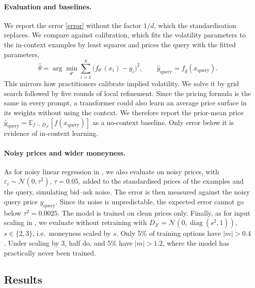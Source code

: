   \paragraph{Evaluation and baselines.}
  We report the error \eqref{error} without the factor $1/d$, which the standardisation
  replaces. We compare against calibration, which fits the volatility parameters to the
  in-context examples by least squares and prices the query with the fitted parameters,
  \begin{equation}
    \hat\theta = \arg\min_{\theta'} \sum_{i=1}^{k} \big(f_{\theta'}(x_i) - y_i\big)^2,
    \qquad \hat y_{\text{query}} = f_{\hat\theta}(x_{\text{query}}).
  \end{equation}
  This mirrors how practitioners calibrate implied volatility. We solve it by grid search
  followed by five rounds of local refinement. Since the pricing formula is the same in
  every prompt, a transformer could also learn an average price surface in its weights
  without using the context. We therefore report the prior-mean price
  $\hat y_{\text{query}} = \mathbb{E}_{f \sim D_\mathcal{F}}[f(x_{\text{query}})]$ as a
  no-context baseline. Only error below it is evidence of in-context learning.
    
    \vspace{-1em}
  \paragraph{Noisy prices and wider moneyness.}
  As for noisy linear regression in \cite{garg2022what}, we also evaluate on noisy prices,
  with $\varepsilon_i \sim \mathcal{N}(0, \tau^2)$, $\tau = 0.05$, added to the standardised
  prices of the examples and the query, simulating bid--ask noise. The error is then
  measured against the noisy query price $y_{\text{query}}$. Since its noise is
  unpredictable, the expected error cannot go below $\tau^2 = 0.0025$. The model is trained
  on clean prices only. Finally, as for input scaling in \cite{garg2022what}, we evaluate
  without retraining with $D_\mathcal{X} = \mathcal{N}(0, \operatorname{diag}(s^2, 1))$,
  $s \in \{2, 3\}$, i.e.\ moneyness scaled by $s$. Only 5\% of training options have
  $|m| > 0.4$. Under scaling by 3, half do, and 5\% have $|m| > 1.2$, where the model has
  practically never been trained.

\vspace{-0.5em}
\subsection{Results}
\vspace{-0.5em}
